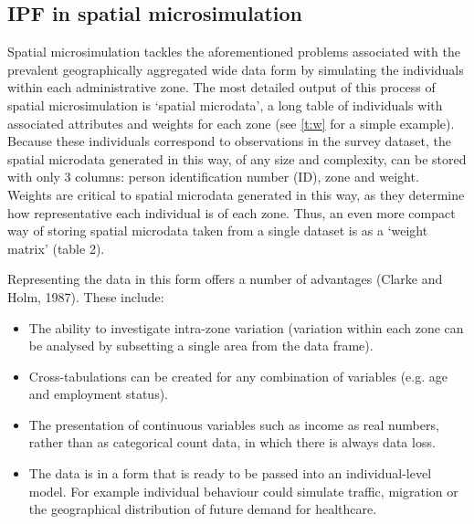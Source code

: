 \documentclass[a4paper,10pt]{article}
\begin{document}
\subsection{IPF in spatial microsimulation}
Spatial microsimulation tackles the aforementioned problems associated
with the prevalent geographically aggregated wide data form by simulating
the individuals within each administrative zone. The most detailed output of this process of 
spatial microsimulation is `spatial microdata', a long table of individuals with 
associated attributes and weights for each zone (see \cref{t:w} %
 for a simple example). 
Because these individuals correspond to observations in the survey dataset,
the spatial microdata generated in this way, of any size and complexity,
can be stored with only 3 columns: person identification number (ID), 
zone and weight. Weights are critical to spatial microdata generated in this way, as they 
determine how representative each individual is of each zone. Thus, an even more compact way 
of storing spatial microdata taken from a single dataset is as a `weight matrix' (table 2). 

Representing the data in this form offers a number of advantages (Clarke and Holm, 1987). These include:
\begin{itemize}
 \item The ability to investigate intra-zone variation (variation within each zone can be analysed
 by subsetting a single area from the data frame).
\item Cross-tabulations can be created for any combination of variables (e.g. age and employment status).
\item The presentation of continuous variables such as income as real numbers, 
rather than as categorical count data, in which there is always data loss.
\item The data is in a form that is ready to be passed into an individual-level model.
For example individual behaviour could simulate traffic, migration or the geographical distribution of future demand for healthcare.
\end{itemize}
\end{document}
